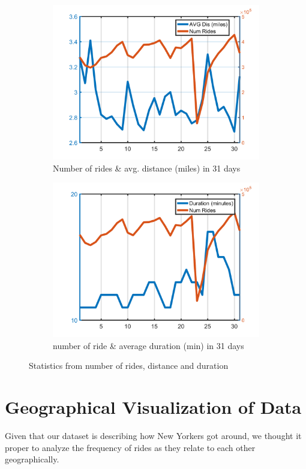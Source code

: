 \documentclass{article}
\begin{document}
\begin{figure}[H]
\begin{subfigure}{.5\linewidth}
  \centering
  \includegraphics[width=.8\linewidth]{numride_dom}
  \caption{Number of rides \& avg. distance (miles) in 31 days}
  \label{fig:sub5}
\end{subfigure}%
\begin{subfigure}{.5\linewidth}
  \centering
  \includegraphics[width=.8\linewidth]{numride_dom_dur}
  \caption{number of ride \& average duration (min) in 31 days}
  \label{fig:sub6}
\end{subfigure}

\caption{Statistics from number of rides, distance and duration}
\label{fig:ride_stats}
\end{figure}

\section{Geographical Visualization of Data}
Given that our dataset is describing how New Yorkers got around, we thought it proper to analyze the frequency of rides as they relate to each other geographically. 
\end{document}
